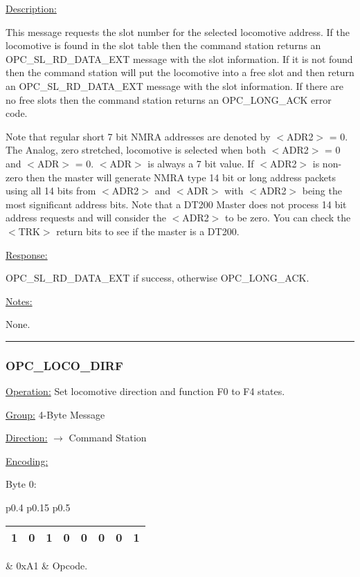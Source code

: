 \underline{Description:}

This message requests the slot number for the selected locomotive address. If the locomotive is found in the slot table then the command station returns an OPC\_SL\_RD\_DATA\_EXT message with the slot information. If it is not found then the command station will put the locomotive into a free slot and then return an OPC\_SL\_RD\_DATA\_EXT message with the slot information. If there are no free slots then the command station returns an OPC\_LONG\_ACK error code.

Note that regular short 7 bit NMRA addresses are denoted by $<$ADR2$>$ = 0. The Analog, zero stretched, locomotive is selected when both $<$ADR2$>$ = 0 and $<$ADR$>$ = 0. $<$ADR$>$ is always a 7 bit value. If $<$ADR2$>$ is non-zero then the master will generate NMRA type 14 bit or long address packets using all 14 bits from $<$ADR2$>$ and $<$ADR$>$ with $<$ADR2$>$ being the most significant address bits. Note that a DT200 Master does not process 14 bit address requests and will consider the $<$ADR2$>$ to be zero. You can check the $<$TRK$>$ return bits to see if the master is a DT200.

\underline{Response:} 

OPC\_SL\_RD\_DATA\_EXT if success, otherwise OPC\_LONG\_ACK.

\underline{Notes:} 

None.

\rule{15.1cm}{0.4pt}
\subsubsection{OPC\_LOCO\_DIRF}
\underline{Operation:} Set locomotive direction and function F0 to F4 states.

\underline{Group:} \hspace{0.5cm} 4-Byte Message

\underline{Direction:} \hspace{0.05cm} $\rightarrow$ Command Station

\underline{Encoding:} 

Byte 0:

\begin{tabular}{p{0.4\linewidth} p{0.15\linewidth} p{0.5\linewidth}} 

\begin{tabular}{|p{0.3cm}|p{0.3cm}|p{0.3cm}|p{0.3cm}|p{0.3cm}|p{0.3cm}|p{0.3cm}|p{0.3cm}|}
\hline
1 & 0 & 1 & 0 & 0 & 0 & 0 & 1\\
\hline
\end{tabular}
& 0xA1 & Opcode.\\
\end{tabular}

